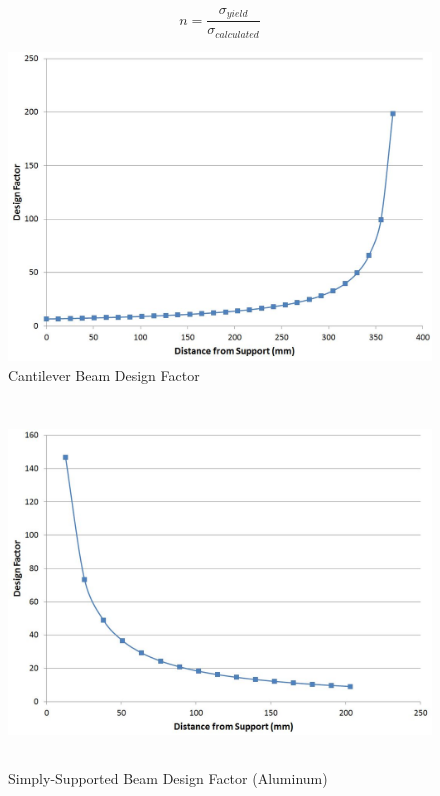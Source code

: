 \documentclass[12pt]{article}
\begin{document}
\begin{equation}
n=\frac{\sigma_{yield}}{\sigma_{calculated}}
\end{equation}
\bigskip
\bigskip



\begin{figure}[h!]  
  \centering
    \includegraphics[width=\linewidth]{cantilever_df.JPG}
    \caption{Cantilever Beam Design Factor} 
\end{figure}

\newpage

\begin{figure}[h!]  
  \centering
    \includegraphics[width=\linewidth, height=3.8in]{ss_a_df.JPG}
    \caption{Simply-Supported Beam Design Factor (Aluminum)} 
\end{figure}
\end{document}
